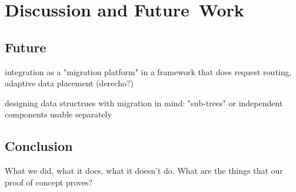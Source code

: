 \chapter{Discussion and Future~Work}
\label{chap:discussionfuture}


\section{Future}

integration as a "migration platform" in a framework that does request routing,
adaptive data placement (derecho?)

designing data structrues with migration in mind: "sub-trees" or independent
components usable separately


\section{Conclusion}
What we did, what it does, what it doesn't do. What are the things that our
proof of concept proves?

